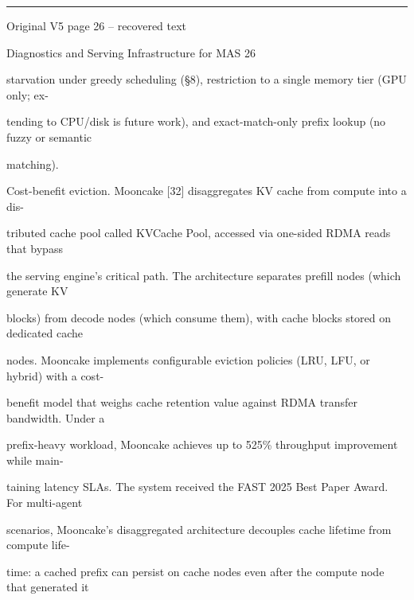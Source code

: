 \par\smallskip\noindent\rule{\textwidth}{0.4pt}\par{\sffamily\footnotesize Original V5 page 26 -- recovered text}\par\begin{flushleft}\footnotesize\ttfamily
\par\smallskip
\par\smallskip
\noindent Diagnostics and Serving Infrastructure for MAS 26\par
\par\smallskip
\par\smallskip
\par\smallskip
\noindent starvation under greedy scheduling (§8), restriction to a single memory tier (GPU only; ex-\par
\noindent tending to CPU/disk is future work), and exact-match-only prefix lookup (no fuzzy or semantic\par
\noindent matching).\par
\par\smallskip
\noindent Cost-benefit eviction. Mooncake [32] disaggregates KV cache from compute into a dis-\par
\noindent tributed cache pool called KVCache Pool, accessed via one-sided RDMA reads that bypass\par
\noindent the serving engine’s critical path. The architecture separates prefill nodes (which generate KV\par
\noindent blocks) from decode nodes (which consume them), with cache blocks stored on dedicated cache\par
\noindent nodes. Mooncake implements configurable eviction policies (LRU, LFU, or hybrid) with a cost-\par
\noindent benefit model that weighs cache retention value against RDMA transfer bandwidth. Under a\par
\noindent prefix-heavy workload, Mooncake achieves up to 525\% throughput improvement while main-\par
\noindent taining latency SLAs. The system received the FAST 2025 Best Paper Award. For multi-agent\par
\noindent scenarios, Mooncake’s disaggregated architecture decouples cache lifetime from compute life-\par
\noindent time: a cached prefix can persist on cache nodes even after the compute node that generated it\par

\end{flushleft}
